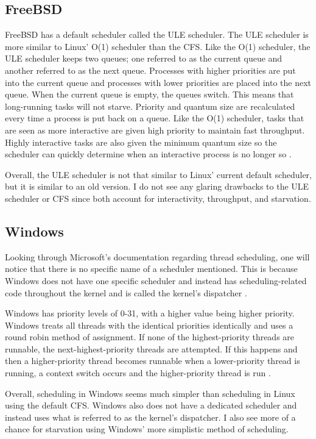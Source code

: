 \documentclass[10pt,draftclsnofoot,onecolumn,journal,compsoc]{IEEEtran}
\begin{document}
\subsection{FreeBSD}
FreeBSD has a default scheduler called the ULE scheduler. The ULE scheduler is more similar to Linux' O(1) scheduler than the CFS. Like the O(1) scheduler, the ULE scheduler keeps two queues; one referred to as the current queue and another referred to as the next queue. Processes with higher priorities are put into the current queue and processes with lower priorities are placed into the next queue. When the current queue is empty, the queues switch. This means that long-running tasks will not starve. Priority and quantum size are recalculated every time a process is put back on a queue. Like the O(1) scheduler, tasks that are seen as more interactive are given high priority to maintain fast throughput. Highly interactive tasks are also given the minimum quantum size so the scheduler can quickly determine when an interactive process is no longer so \cite{bsd_shd}.

Overall, the ULE scheduler is not that similar to Linux' current default scheduler, but it is similar to an old version. I do not see any glaring drawbacks to the ULE scheduler or CFS since both account for interactivity, throughput, and starvation. 

\subsection{Windows}
Looking through Microsoft's documentation regarding thread scheduling, one will notice that there is no specific name of a scheduler mentioned. This is because Windows does not have one specific scheduler and instead has scheduling-related code throughout the kernel and is called the kernel's dispatcher \cite{win_shd}. 

Windows has priority levels of 0-31, with a higher value being higher priority. Windows treats all threads with the identical priorities identically and uses a round robin method of assignment. If none of the highest-priority threads are runnable, the next-highest-priority threads are attempted. If this happens and then a higher-priority thread becomes runnable when a lower-priority thread is running, a context switch occurs and the higher-priority thread is run \cite{win_shd2}. 

Overall, scheduling in Windows seems much simpler than scheduling in Linux using the default CFS. Windows also does not have a dedicated scheduler and instead uses what is referred to as the kernel's dispatcher. I also see more of a chance for starvation using Windows' more simplistic method of scheduling.
\end{document}
